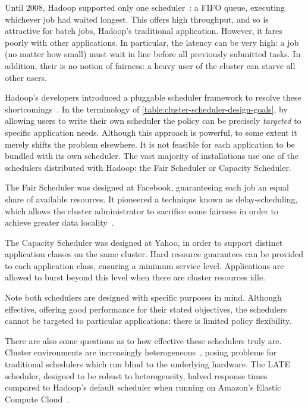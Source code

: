 Until 2008, Hadoop supported only one scheduler~\cite{HadoopFairSchedulerJIRA}: a FIFO queue, executing whichever job had waited longest. This offers high throughput, and so is attractive for batch jobs, Hadoop's traditional application. However, it fares poorly with other applications. In particular, the latency can be very high: a job (no matter how small) must wait in line before all previously submitted tasks. In addition, their is no notion of fairness: a heavy user of the cluster can starve all other users.

Hadoop's developers introduced a pluggable scheduler framework to resolve these shortcomings~\cite{HadoopSchedulingIBM}. In the terminology of \cref{table:cluster-scheduler-design-goals}, by allowing users to write their own scheduler the policy can be precisely \emph{targeted} to specific application needs. Although this approach is powerful, to some extent it merely shifts the problem elsewhere. It is not feasible for each application to be bundled with its own scheduler\footnotemark. The vast majority of installations use one of the schedulers distributed with Hadoop: the Fair Scheduler or Capacity Scheduler.

The Fair Scheduler was designed at Facebook, guaranteeing each job an equal share of available resources. It pioneered a technique known as delay-scheduling, which allows the cluster administrator to sacrifice some fairness in order to achieve greater data locality~\cite{Zaharia:2010}. 

The Capacity Scheduler was designed at Yahoo, in order to support distinct application classes on the same cluster. Hard resource guarantees can be provided to each application class, ensuring a minimum service level. Applications are allowed to burst beyond this level when there are cluster resources idle.

Note both schedulers are designed with specific purposes in mind. Although effective, offering good performance for their stated objectives, the schedulers cannot be targeted to particular applications: there is limited policy flexibility.

There are also some questions as to how effective these schedulers truly are. Cluster environments are increasingly heterogeneous~\cite{Reiss:2012}, posing problems for traditional schedulers which run blind to the underlying hardware. The LATE scheduler, designed to be robust to heterogeneity, halved response times compared to Hadoop's default scheduler when running on Amazon's Elastic Compute Cloud~\cite{Zaharia:2008}.

